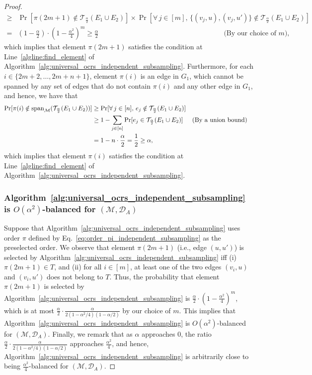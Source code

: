 \documentclass[11pt]{article}
\newcommand{\D}{\mathcal D}
\newcommand{\M}{{\mathcal M}}
\newcommand{\T}{{\mathcal T}}
\newcommand{\spa}{\textnormal{span}}
\begin{document}
\begin{proof}
\begin{align*}
    \ge&\Pr[\pi(2m+1)\notin\T_{\frac{\alpha}{2}}(E_1\cup E_2)]\times\Pr[\forall\,j\in[m],\,\{(v_j,u),(v_j,u')\}\notin\T_{\frac{\alpha}{2}}(E_1\cup E_2)]\\
    =&\left(1-\frac{\alpha}{2}\right)\cdot\left(1-\frac{\alpha^2}{4}\right)^m\ge\frac{\alpha}{2}\qquad\qquad\qquad\qquad\qquad\qquad\qquad\qquad\qquad\text{(By our choice of $m$)},
\end{align*}
which implies that element $\pi(2m+1)$ satisfies the condition at Line~\ref{algline:find_element} of Algorithm~\ref{alg:universal_ocrs_independent_subsampling}. Furthermore, for each $i\in\{2m+2,\dots,2m+n+1\}$, element $\pi(i)$ is an edge in $G_1$, which cannot be spanned by any set of edges that do not contain $\pi(i)$ and any other edge in $G_1$, and hence, we have that
\begin{align*}
    \Pr[\pi(i)\notin\spa_{\M}(\T_{\frac{\alpha}{2}}(E_1\cup E_2))]&\ge\Pr[\forall\,j\in[n],\,e_j\notin\T_{\frac{\alpha}{2}}(E_1\cup E_2)]\\
    &\ge1-\sum_{j\in[n]}\Pr[e_j\in\T_{\frac{\alpha}{2}}(E_1\cup E_2)]&&\text{(By a union bound)}\\
    &=1-n\cdot\frac{\alpha}{2}=\frac{1}{2}\ge\alpha,
\end{align*}
which implies that element $\pi(i)$ satisfies the condition at Line~\ref{algline:find_element} of Algorithm~\ref{alg:universal_ocrs_independent_subsampling}.
\subsubsection*{Algorithm~\ref{alg:universal_ocrs_independent_subsampling} is $O(\alpha^2)$-balanced for $(\M,\D_A)$}
Suppose that Algorithm~\ref{alg:universal_ocrs_independent_subsampling} uses order $\pi$ defined by Eq.~\eqref{eq:order_pi_independent_subsampling} as the preselected order.
We observe that element $\pi(2m+1)$ (i.e., edge $(u,u')$) is selected by Algorithm~\ref{alg:universal_ocrs_independent_subsampling} iff (i) $\pi(2m+1)\in T$, and (ii) for all $i\in[m]$, at least one of the two edges $(v_i,u)$ and $(v_i,u')$ does not belong to $T$. Thus, the probability that element $\pi(2m+1)$ is selected by Algorithm~\ref{alg:universal_ocrs_independent_subsampling} is $\frac{\alpha}{2}\cdot\left(1-\frac{\alpha^2}{4}\right)^m$, which is at most $\frac{\alpha}{2}\cdot \frac{\alpha}{2(1-\alpha^2/4)(1-\alpha/2)}$ by our choice of $m$. This implies that Algorithm~\ref{alg:universal_ocrs_independent_subsampling} is $O(\alpha^2)$-balanced for $(\M,\D_A)$. Finally, we remark that as $\alpha$ approaches $0$, the ratio $\frac{\alpha}{2}\cdot \frac{\alpha}{2(1-\alpha^2/4)(1-\alpha/2)}$ approaches $\frac{\alpha^2}{4}$, and hence, Algorithm~\ref{alg:universal_ocrs_independent_subsampling} is arbitrarily close to being $\frac{\alpha^2}{4}$-balanced for $(\M,\D_A)$.
\end{proof}
\end{document}
